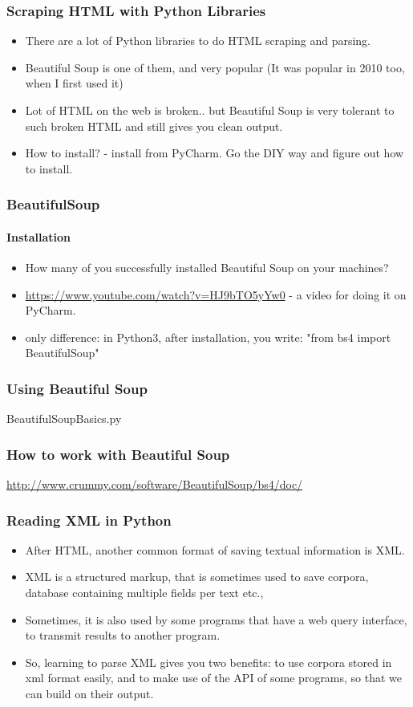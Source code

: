 \documentclass{beamer}
\begin{document}
\begin{frame}
\frametitle{Scraping HTML with Python Libraries}
\begin{itemize}
\item There are a lot of Python libraries to do HTML scraping and parsing.
\item Beautiful Soup is one of them, and very popular (It was popular in 2010 too, when I first used it)
\item Lot of HTML on the web is broken.. but Beautiful Soup is very tolerant to such broken HTML and still gives you clean output.
\item How to install? - install from PyCharm. Go the DIY way and figure out how to install.
\end{itemize}
\end{frame}

\begin{frame}
\frametitle{BeautifulSoup}
\framesubtitle{Installation}
\begin{itemize}
\item How many of you successfully installed Beautiful Soup on your machines? \pause
\item \url{https://www.youtube.com/watch?v=HJ9bTO5yYw0} - a video for doing it on PyCharm. 
\item only difference: in Python3, after installation, you write: "from bs4 import BeautifulSoup"
\end{itemize}
\end{frame}

\begin{frame}
\frametitle{Using Beautiful Soup}
BeautifulSoupBasics.py
\end{frame}

\begin{frame}
\frametitle{How to work with Beautiful Soup}
\url{http://www.crummy.com/software/BeautifulSoup/bs4/doc/}
\end{frame}

\begin{frame}
\frametitle{Reading XML in Python}
\begin{itemize}
\item After HTML, another common format of saving textual information is XML. 
\item XML is a structured markup, that is sometimes used to save corpora, database containing multiple fields per text etc.,
\item Sometimes, it is also used by some programs that have a web query interface, to transmit results to another program. 
\item So, learning to parse XML gives you two benefits: to use corpora stored in xml format easily, and to make use of the API of some programs, so that we can build on their output.
\end{itemize}
\end{frame}
\end{document}
